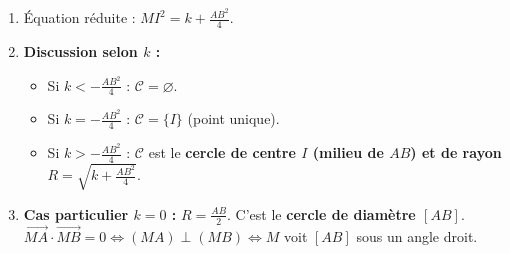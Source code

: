 \documentclass[11pt]{article}
\begin{document}
\begin{methode}[Ligne de niveau $\mathcal{C} = \{ M \mid \overrightarrow{MA} \cdot \overrightarrow{MB} = k \}$]
\begin{enumerate}
    \item Équation réduite : $MI^2 = k + \frac{AB^2}{4}$.
    \item \textbf{Discussion selon $k$ :}
    \begin{itemize}
        \item Si $k < -\frac{AB^2}{4}$ : $\mathcal{C} = \varnothing$.
        \item Si $k = -\frac{AB^2}{4}$ : $\mathcal{C} = \{ I \}$ (point unique).
        \item Si $k > -\frac{AB^2}{4}$ : $\mathcal{C}$ est le \textbf{cercle de centre $I$ (milieu de $AB$) et de rayon $R = \sqrt{k + \frac{AB^2}{4}}$}.
    \end{itemize}
    \item \textbf{Cas particulier $k=0$ :} $R = \frac{AB}{2}$. C'est le \textbf{cercle de diamètre $[AB]$}.
    $\overrightarrow{MA} \cdot \overrightarrow{MB} = 0 \iff (MA) \perp (MB) \iff M$ voit $[AB]$ sous un angle droit.
\end{enumerate}
\end{methode}
\end{document}
